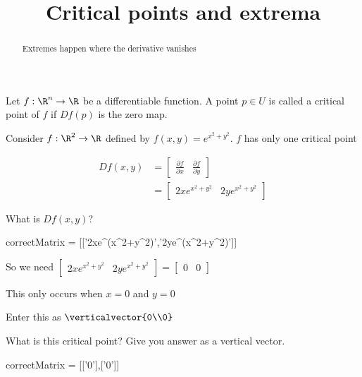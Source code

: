 \documentclass{ximera}
\title{Critical points and extrema}
\begin{document}
	\begin{abstract}
		Extremes happen where the derivative vanishes
	\end{abstract}
	
	
	\begin{definition}
		Let $f:\R^n \to \R $ be a differentiable function.  A point $p \in U$ is called a critical point of $f$ if $Df(p)$ is the zero map.
	\end{definition}
	
	\begin{question}
		Consider \(f: \R^2 \to \R\) defined by $f(x,y) = e^{x^2+y^2}$.  $f$ has only one critical point
		\begin{solution}
			\begin{hint}
				\begin{question}
					\begin{solution}
						\begin{hint}
							\begin{align*}
								Df(x,y) &= \begin{bmatrix} \frac{\partial f}{\partial x} & \frac{\partial f}{\partial y}\end{bmatrix}\\
									&= \begin{bmatrix} 2xe^{x^2+y^2} & 2ye^{x^2+y^2}\end{bmatrix}
							\end{align*}
						\end{hint}
						What is $Df(x,y)$?
							\begin{matrix-answer}
								correctMatrix = [['2xe^(x^2+y^2)','2ye^(x^2+y^2)']]
							\end{matrix-answer}
					\end{solution}
				\end{question}
			\end{hint}
			\begin{hint}
				So we need \(\begin{bmatrix} 2xe^{x^2+y^2} & 2ye^{x^2+y^2}\end{bmatrix} = \begin{bmatrix} 0 & 0\end{bmatrix}\)
			\end{hint}
			\begin{hint}
				This only occurs when $x=0$ and $y=0$
			\end{hint}
			\begin{hint}
				Enter this as $\verticalvector{0\\0}$
			\end{hint}
			What is this critical point?  Give you answer as a vertical vector.
			\begin{matrix-answer}
				correctMatrix = [['0'],['0']]
			\end{matrix-answer}
		\end{solution}
	\end{question}
	
\end{document}
